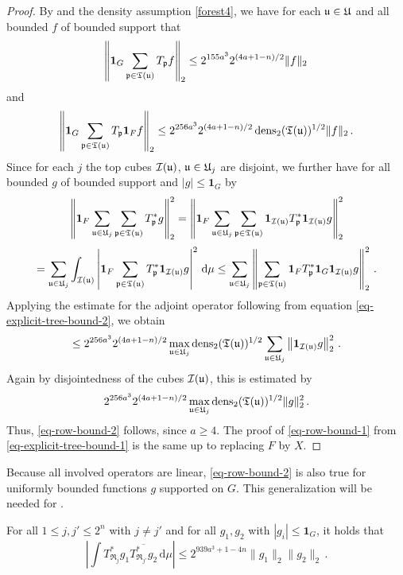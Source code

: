 \begin{proof}
    By  and the density assumption \eqref{forest4}, we have for each ${\mathfrak u} \in {\mathfrak U}$ and all bounded $f$ of bounded support that
    \begin{equation}
        \label{eq-explicit-tree-bound-1}
        \left\|\mathbf{1}_G\sum_{{\mathfrak p} \in {\mathfrak T}({\mathfrak u})} T_{{\mathfrak p}} f \right\|_{2} \le 2^{155a^3} 2^{(4a+1-n)/2} \|f\|_2\,
    \end{equation}
    and
    \begin{equation}
        \label{eq-explicit-tree-bound-2}
        \left\|\mathbf{1}_G \sum_{{\mathfrak p} \in {\mathfrak T}({\mathfrak u})} T_{{\mathfrak p}} \mathbf{1}_F f \right\|_{2} \le 2^{256a^3} 2^{(4a + 1-n)/2} \operatorname{\operatorname{dens}}_2({\mathfrak T}({\mathfrak u}))^{1/2} \|f\|_2\,.
    \end{equation}
    Since for each $j$ the top cubes ${\mathcal{I}}({\mathfrak u})$, ${\mathfrak u} \in {\mathfrak U}_j$ are disjoint, we further have for all bounded $g$ of bounded support and $|g| \le \mathbf{1}_G$ by 
    $$
        \left\|\mathbf{1}_F \sum_{{\mathfrak u} \in {\mathfrak U}_j} \sum_{{\mathfrak p} \in {\mathfrak T}({\mathfrak u})} T_{{\mathfrak p}}^* g\right\|_2^2 = \left\|\mathbf{1}_F \sum_{{\mathfrak u} \in {\mathfrak U}_j} \sum_{{\mathfrak p} \in {\mathfrak T}({\mathfrak u})} \mathbf{1}_{{\mathcal{I}}({\mathfrak u})} T_{{\mathfrak p}}^* \mathbf{1}_{{\mathcal{I}}({\mathfrak u})} g\right\|_2^2
    $$
    $$
        = \sum_{{\mathfrak u} \in {\mathfrak U}_j} \int_{{\mathcal{I}}({\mathfrak u})} \left| \mathbf{1}_F \sum_{{\mathfrak p} \in {\mathfrak T}({\mathfrak u})} T_{{\mathfrak p}}^* \mathbf{1}_{{\mathcal{I}}({\mathfrak u})} g\right|^2 \, \mathrm{d}\mu
        \le \sum_{{\mathfrak u} \in {\mathfrak U}_j} \left\|\sum_{{\mathfrak p} \in {\mathfrak T}({\mathfrak u})} \mathbf{1}_F T_{{\mathfrak p}}^* \mathbf{1}_G \mathbf{1}_{{\mathcal{I}}({\mathfrak u})}  g\right\|_2^2\,.
    $$
    Applying the estimate for the adjoint operator following from equation \eqref{eq-explicit-tree-bound-2}, we obtain
    $$
        \le 2^{256a^3} 2^{(4a+1-n)/2} \max_{{\mathfrak u} \in {\mathfrak U}_j}\operatorname{\operatorname{dens}}_2({\mathfrak T}({\mathfrak u}))^{1/2} \sum_{{\mathfrak u} \in {\mathfrak U}_j} \left\| \mathbf{1}_{{\mathcal{I}}({\mathfrak u})} g\right\|_2^2\,.
    $$
    Again by disjointedness of the cubes ${\mathcal{I}}({\mathfrak u})$, this is estimated by
    $$
        2^{256a^3} 2^{(4a+1-n)/2} \max_{{\mathfrak u} \in {\mathfrak U}_j}\operatorname{\operatorname{dens}}_2({\mathfrak T}({\mathfrak u}))^{1/2} \|g\|_2^2\,.
    $$
    Thus, \eqref{eq-row-bound-2} follows, since $a \ge 4$.
    The proof of \eqref{eq-row-bound-1} from \eqref{eq-explicit-tree-bound-1} is the same up to replacing $F$ by $X$.
\end{proof}

Because all involved operators are linear, \eqref{eq-row-bound-2} is also true for uniformly bounded functions $g$ supported on $G$. This generalization will be needed for .

\begin{lemma}
    \label{row-correlation}
    \leanok
    For all $1 \le j,j' \le 2^n$ with $j\ne j'$ and for all $g_1, g_2$ with $|g_i| \le \mathbf{1}_G$, it holds that
    $$
        \left| \int T_{\mathfrak{R}_j}^*g_1 \overline{T_{\mathfrak{R}_{j'}}^*g_2} \, \mathrm{d}\mu \right| \le
        2^{939a^3+1-4n}\|g_1\|_2 \|g_2\|_2\,.
    $$
\end{lemma}

